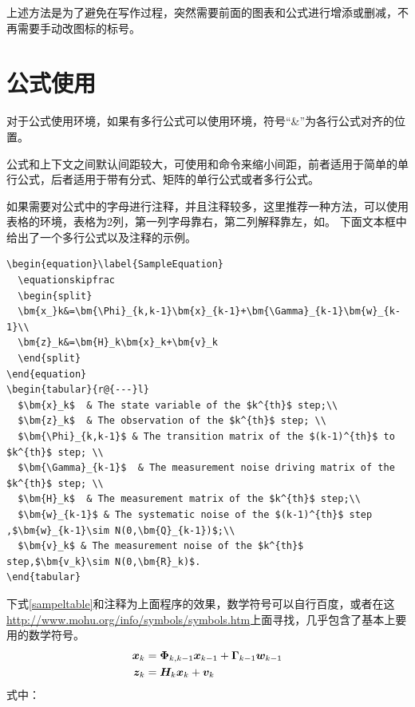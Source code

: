{\begin{spacing}{1.5}
上述方法是为了避免在写作过程，突然需要前面的图表和公式进行增添或删减，不再需要手动改图标的标号。

\section{公式使用}
对于公式使用环境，如果有多行公式可以使用环境，符号“\&”为各行公式对齐的位置。

公式和上下文之间默认间距较大，可使用和命令来缩小间距，前者适用于简单的单行公式，后者适用于带有分式、矩阵的单行公式或者多行公式。

如果需要对公式中的字母进行注释，并且注释较多，这里推荐一种方法，可以使用表格的环境，表格为2列，第一列字母靠右，第二列解释靠左，如。 
下面文本框中给出了一个多行公式以及注释的示例。
\vspace{-4ex}
\begin{lstlisting}
\begin{equation}\label{SampleEquation}
  \equationskipfrac
  \begin{split}
  \bm{x_}k&=\bm{\Phi}_{k,k-1}\bm{x}_{k-1}+\bm{\Gamma}_{k-1}\bm{w}_{k-1}\\
  \bm{z}_k&=\bm{H}_k\bm{x}_k+\bm{v}_k
  \end{split}
\end{equation}
\begin{tabular}{r@{---}l}
  $\bm{x}_k$  & The state variable of the $k^{th}$ step;\\
  $\bm{z}_k$  & The observation of the $k^{th}$ step; \\
  $\bm{\Phi}_{k,k-1}$ & The transition matrix of the $(k-1)^{th}$ to $k^{th}$ step; \\
  $\bm{\Gamma}_{k-1}$  & The measurement noise driving matrix of the $k^{th}$ step; \\
  $\bm{H}_k$  & The measurement matrix of the $k^{th}$ step;\\
  $\bm{w}_{k-1}$ & The systematic noise of the $(k-1)^{th}$ step ,$\bm{w}_{k-1}\sim N(0,\bm{Q}_{k-1})$;\\
  $\bm{v}_k$ & The measurement noise of the $k^{th}$ step,$\bm{v_k}\sim N(0,\bm{R}_k)$.
\end{tabular}
\end{lstlisting}
\vspace{-2ex}

下式\ref{sampeltable}和注释为上面程序的效果，数学符号可以自行百度，或者在这\url{http://www.mohu.org/info/symbols/symbols.htm}上面寻找，几乎包含了基本上要用的数学符号。
\begin{equation}\label{SampleEquation}
  \equationskipfrac
  \begin{split}
  \bm{x_}k&=\bm{\Phi}_{k,k-1}\bm{x}_{k-1}+\bm{\Gamma}_{k-1}\bm{w}_{k-1}\\
  \bm{z}_k&=\bm{H}_k\bm{x}_k+\bm{v}_k
  \end{split}
\end{equation}
式中：


\end{spacing}}
